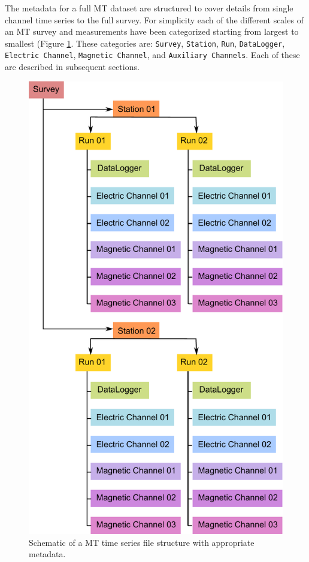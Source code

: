 \documentclass{article}
\begin{document}
The metadata for a full MT dataset are structured to cover details from single channel time series to the full survey. For simplicity each of the different scales of an MT survey and measurements have been categorized starting from largest to smallest (Figure \ref{fig:example}. These categories are: \verb|Survey|, \verb|Station|, \verb|Run|, \verb|DataLogger|, \verb|Electric Channel|, \verb|Magnetic Channel|, and \verb|Auxiliary Channels|. Each of these are described in subsequent sections.  

\begin{figure}[htb!]
	\centering
	\includegraphics[height=.625\textheight]{example_mt_file_structure.pdf}
	\caption{Schematic of a MT time series file structure with appropriate metadata.}
	\label{fig:example}
\end{figure}
\end{document}
